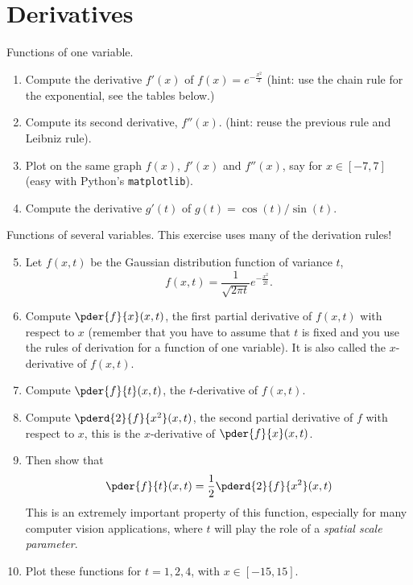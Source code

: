 \documentclass[a4paper,10pt]{article}
\begin{document}
\section{Derivatives}
Functions of one variable.
\begin{enumerate}
  \item Compute the derivative $f'(x)$ of $f(x) = e^{-\frac{x^2}{2}}$ (hint: use the chain rule for the exponential, see the tables below.)
  \item Compute its second derivative, $f''(x)$. (hint: reuse the previous rule and Leibniz rule).
  \item Plot on the same graph $f(x)$, $f'(x)$ and $f''(x)$, say for $x\in[-7,7]$ (easy with Python's \texttt{matplotlib}).
  \item Compute the derivative $g'(t)$ of $g(t) = \cos(t)/\sin(t)$.
\end{enumerate}
Functions of several variables. This exercise uses many of the derivation rules!
\begin{enumerate}
	\setcounter{enumi}{4}
  \item Let $f(x,t)$ be the Gaussian distribution function of variance $t$,
  $$
  f(x,t) = \frac1{\sqrt{2\pi t}}e^{-\frac{x^2}{2t}}.
  $$
  \item Compute $\pder{f}{x}(x,t)$, the first partial derivative of $f(x,t)$ with respect to $x$ (remember that you have to assume that $t$ is fixed and you use the rules of derivation for a function of one variable).
  It is also called the $x$-derivative of $f(x,t)$.
  \item Compute $\pder{f}{t}(x,t)$, the $t$-derivative of $f(x,t)$.
  \item Compute $\pderd{2}{f}{x^2}(x,t)$, the second partial derivative of $f$ with respect to $x$, this is the $x$-derivative of $\pder{f}{x}(x,t)$.
  \item Then show that 
  $$
  \pder{f}{t}(x,t) = \frac12\pderd{2}{f}{x^2}(x,t)
  $$
  This is an extremely important property of this function, especially for many computer vision applications, where $t$ will play the role of a \emph{spatial scale parameter}.
  \item Plot these functions for $t=1,2,4$, with $x\in [-15,15]$.
\end{enumerate}
\end{document}
